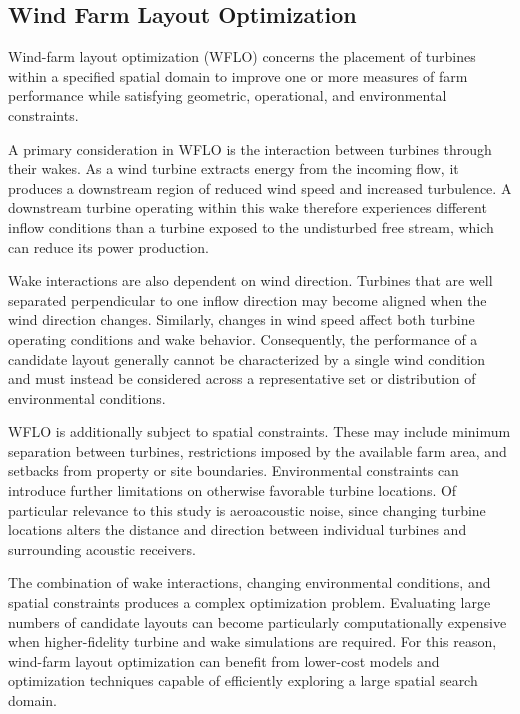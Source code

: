 \documentclass[11pt]{article}
\begin{document}
\subsection{Wind Farm Layout Optimization}

Wind-farm layout optimization (WFLO) concerns the placement of turbines within a specified spatial domain to improve one or more measures of farm performance while satisfying geometric, operational, and environmental constraints.

A primary consideration in WFLO is the interaction between turbines through their wakes. As a wind turbine extracts energy from the incoming flow, it produces a downstream region of reduced wind speed and increased turbulence. A downstream turbine operating within this wake therefore experiences different inflow conditions than a turbine exposed to the undisturbed free stream, which can reduce its power production.

Wake interactions are also dependent on wind direction. Turbines that are well separated perpendicular to one inflow direction may become aligned when the wind direction changes. Similarly, changes in wind speed affect both turbine operating conditions and wake behavior. Consequently, the performance of a candidate layout generally cannot be characterized by a single wind condition and must instead be considered across a representative set or distribution of environmental conditions.

WFLO is additionally subject to spatial constraints. These may include minimum separation between turbines, restrictions imposed by the available farm area, and setbacks from property or site boundaries. Environmental constraints can introduce further limitations on otherwise favorable turbine locations. Of particular relevance to this study is aeroacoustic noise, since changing turbine locations alters the distance and direction between individual turbines and surrounding acoustic receivers.

The combination of wake interactions, changing environmental conditions, and spatial constraints produces a complex optimization problem. Evaluating large numbers of candidate layouts can become particularly computationally expensive when higher-fidelity turbine and wake simulations are required. For this reason, wind-farm layout optimization can benefit from lower-cost models and optimization techniques capable of efficiently exploring a large spatial search domain.
\end{document}
